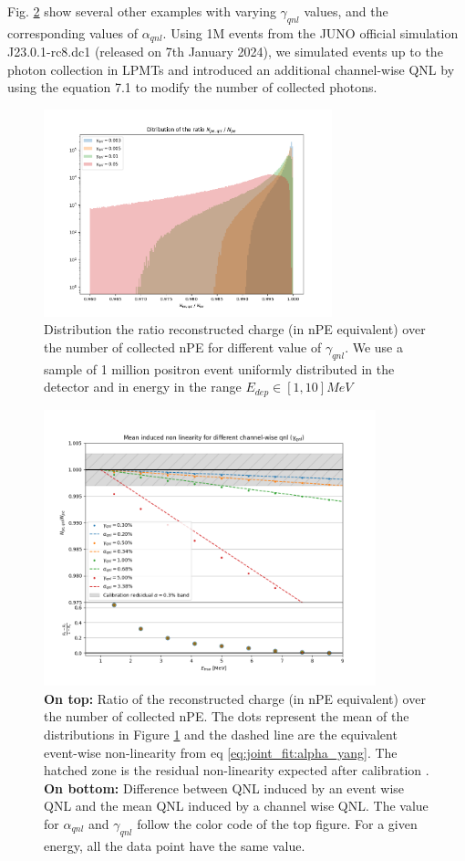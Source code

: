 \documentclass[../main.tex]{subfiles}
\begin{document}
Fig. \ref{fig:joint_fit:gamma_v_alpha} show several other examples with varying $\gamma_{qnl}$ values, and the corresponding values of $\alpha_{qnl}$.
Using 1M events from the JUNO official simulation J23.0.1-rc8.dc1 (released on 7th January 2024), we
simulated events up to the photon collection in LPMTs and introduced an additional channel-wise
QNL by using the equation 7.1 to modify the number of collected photons.

\begin{figure}[ht]
  \centering
  \includegraphics[height=6cm]{images/joint_fit/gamma_eff.png}
  \caption{Distribution the ratio reconstructed charge (in nPE equivalent) over the number of collected nPE for different value of $\gamma_{qnl}$. We use a sample of 1 million positron event uniformly distributed in the detector and in energy in the range $E_{dep} \in [1, 10] MeV$}
  \label{fig:joint_fit:ratio_distrib}
\end{figure}
\begin{figure}[ht]
  \centering
  \includegraphics[height=8cm]{images/joint_fit/gamma_to_alpha.png}
  \caption{\textbf{On top:} Ratio of the reconstructed charge (in nPE equivalent) over the number of collected nPE. The dots represent the mean of the distributions in Figure \ref{fig:joint_fit:ratio_distrib} and the dashed line are the equivalent event-wise non-linearity from eq \ref{eq:joint_fit:alpha_yang}. The hatched zone is the residual non-linearity expected after calibration \cite{juno_collaboration_calibration_2021}. \textbf{On bottom:} Difference between QNL induced by an event wise QNL and the mean QNL induced by a channel wise QNL. The value for $\alpha_{qnl}$ and $\gamma_{qnl}$ follow the color code of the top figure. For a given energy, all the data point have the same value.}
  \label{fig:joint_fit:gamma_v_alpha}
\end{figure}
\end{document}
